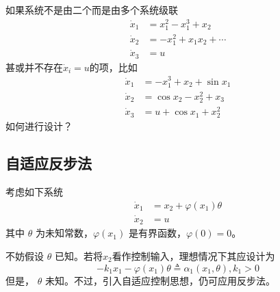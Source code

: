 \begin{problem}\label{Pro:backstep-complex}
如果系统不是由二个而是由多个系统级联
    \begin{align*}
    \dot{x}_1 & = x^2_1 - x^3_1 + x_2\\
    \dot{x}_2 & = - x^2_1 + x_1 x_2 + \cdots \\
    \dot{x}_3 & = u
  \end{align*}
  甚或并不存在$\dot{x}_i=u$的项，比如
  \begin{align*}
    \dot{x}_1 & = -x_1^3+ x_2+\sin x_1\\
    \dot{x}_2 & = \cos x_2-x_2^2 + x_3 \\
    \dot{x}_3 & = u +\cos x_1 +x_2^2
  \end{align*}
  如何进行设计？
\end{problem}

\subsection{自适应反步法}

考虑如下系统
\begin{equation}
    \begin{aligned}
  \dot{x}_1 & = x_2 + \varphi (x_1) \theta\\
  \dot{x}_2 & = u
\end{aligned}\label{Sys:adaptive_backstepping}
\end{equation}
其中 $\theta$ 为未知常数，$\varphi (x_1)$ 是有界函数，$\varphi (0) = 0$。

不妨假设 $\theta$ 已知。若将$x_2$看作控制输入，理想情况下其应设计为
\[- k_1 x_1 - \varphi (x_1) \theta \triangleq \alpha_1 (x_1,\theta), k_1 > 0
\]
但是， $\theta$ 未知。不过，引入自适应控制思想，仍可应用反步法。


